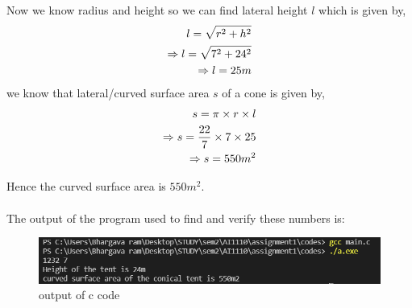 \documentclass[article,12pt,twocolumn]{IEEEtran}
\begin{document}
  Now we know radius and height so we can find lateral height $l$
  which is given by,
  \begin{align*}
    \hspace*{12pt} l = \sqrt{r^2 + h^2} \\
    \Rightarrow l = \sqrt{7^2 + 24^2} \\
    \Rightarrow l = 25 m
  \end{align*}
  we know that lateral/curved surface area $s$ of a cone is given
  by,
  \begin{align*}
    \hspace*{12pt} s = \pi \times r \times l \\
    \Rightarrow  s = \frac{22}{7} \times 7 \times 25  \\
    \Rightarrow  s = 550 m^2 
  \end{align*}
   
  Hence the curved surface area is $ 550 m^2 $. \\\\
 
  The output of the program used to find and verify these numbers
  is: \\
  \begin{figure}[h]
  \centering 
  \includegraphics[scale = 0.6]{output.png}
  \caption{output of c code}
  \end{figure}  
\end{document}
